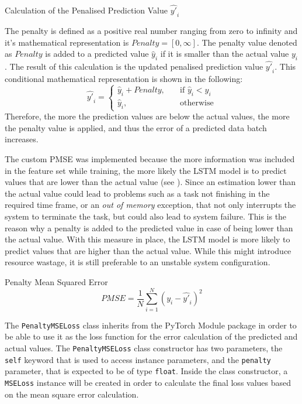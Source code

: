     \begin{pabox}{Calculation of the Penalised Prediction Value $\hat{y'}_i$}
    \label{def:calculation-of-the-penalty-value}

      The penalty is defined as a positive real number ranging from zero to infinity and it's mathematical representation is $Penalty = [0, \infty]$.
      The penalty value denoted as $Penalty$ is added to a predicted value $\hat{y}_i$ if it is smaller than the actual value $y_i$.
      The result of this calculation is the updated penalised prediction value $\hat{y'}_i$.
      This conditional mathematical representation is shown in the following:
      $$\hat{y'}_i = 
      \begin{cases}
        \hat{y}_i + Penalty, & \quad \textrm{if } \hat{y}_i < y_i \\
        \hat{y}_i,  & \quad \textrm{otherwise}
      \end{cases}$$
      Therefore, the more the prediction values are below the actual values, the more the penalty value is applied, and thus the error of a predicted data batch increases.

    \end{pabox}

    The custom PMSE was implemented because the more information was included in the feature set while training, the more likely the LSTM model is to predict values that are lower than the actual value (see ). Since an estimation lower than the actual value could lead to problems such as a task not finishing in the required time frame, or an \emph{out of memory} exception, that not only interrupts the system to terminate the task, but could also lead to system failure. This is the reason why a penalty is added to the predicted value in case of being lower than the actual value. With this measure in place, the LSTM model is more likely to predict values that are higher than the actual value. While this might introduce resource wastage, it is still preferable to an unstable system configuration.

    \begin{pabox}{Penalty Mean Squared Error}
      \label{def:penalty-mean-squared-error-definition}
      $$PMSE = \frac{1}{N} \sum_{i = 1}^{N}\left(y_i - \hat{y'}_i\right)^2$$

    \end{pabox}
    
    
    The \texttt{PenaltyMSELoss} class inherits from the PyTorch Module package in order to be able to use it as the loss function for the error calculation of the predicted and actual values.
    The \texttt{PenaltyMSELoss} class constructor has two parameters, the \texttt{self} keyword that is used to access instance parameters, and the \texttt{penalty} parameter, that is expected to be of type \texttt{float}.
    Inside the class constructor, a \texttt{MSELoss} instance will be created in order to calculate the final loss values based on the mean square error calculation.
    

